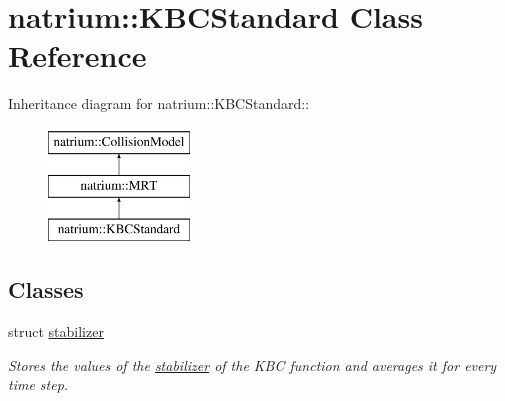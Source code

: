 \hypertarget{classnatrium_1_1KBCStandard}{
\section{natrium::KBCStandard Class Reference}
\label{classnatrium_1_1KBCStandard}
}
Inheritance diagram for natrium::KBCStandard::\begin{figure}[H]
\begin{center}
\leavevmode
\includegraphics[height=3cm]{classnatrium_1_1KBCStandard}
\end{center}
\end{figure}
\subsection*{Classes}
\begin{DoxyCompactItemize}
\item 
struct \hyperlink{structnatrium_1_1KBCStandard_1_1stabilizer}{stabilizer}
\begin{DoxyCompactList}\small\item\em Stores the values of the \hyperlink{structnatrium_1_1KBCStandard_1_1stabilizer}{stabilizer} of the KBC function and averages it for every time step. \item\end{DoxyCompactList}\end{DoxyCompactItemize}
